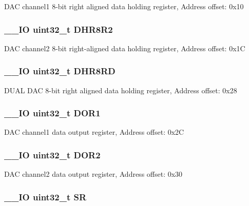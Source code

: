 D\-A\-C channel1 8-\/bit right aligned data holding register, Address offset\-: 0x10 \hypertarget{struct_d_a_c___type_def_a4c435f0e34ace4421241cd5c3ae87fc2}{
\subsubsection[{D\-H\-R8\-R2}]{\setlength{\rightskip}{0pt plus 5cm}\-\_\-\-\_\-\-I\-O uint32\-\_\-t D\-H\-R8\-R2}}\label{struct_d_a_c___type_def_a4c435f0e34ace4421241cd5c3ae87fc2}
D\-A\-C channel2 8-\/bit right-\/aligned data holding register, Address offset\-: 0x1\-C \hypertarget{struct_d_a_c___type_def_a9590269cba8412f1be96b0ddb846ef44}{
\subsubsection[{D\-H\-R8\-R\-D}]{\setlength{\rightskip}{0pt plus 5cm}\-\_\-\-\_\-\-I\-O uint32\-\_\-t D\-H\-R8\-R\-D}}\label{struct_d_a_c___type_def_a9590269cba8412f1be96b0ddb846ef44}
D\-U\-A\-L D\-A\-C 8-\/bit right aligned data holding register, Address offset\-: 0x28 \hypertarget{struct_d_a_c___type_def_aa710505be03a41981c35bacc7ce20746}{
\subsubsection[{D\-O\-R1}]{\setlength{\rightskip}{0pt plus 5cm}\-\_\-\-\_\-\-I\-O uint32\-\_\-t D\-O\-R1}}\label{struct_d_a_c___type_def_aa710505be03a41981c35bacc7ce20746}
D\-A\-C channel1 data output register, Address offset\-: 0x2\-C \hypertarget{struct_d_a_c___type_def_aba9fb810b0cf6cbc1280c5c63be2418b}{
\subsubsection[{D\-O\-R2}]{\setlength{\rightskip}{0pt plus 5cm}\-\_\-\-\_\-\-I\-O uint32\-\_\-t D\-O\-R2}}\label{struct_d_a_c___type_def_aba9fb810b0cf6cbc1280c5c63be2418b}
D\-A\-C channel2 data output register, Address offset\-: 0x30 \hypertarget{struct_d_a_c___type_def_af6aca2bbd40c0fb6df7c3aebe224a360}{
\subsubsection[{S\-R}]{\setlength{\rightskip}{0pt plus 5cm}\-\_\-\-\_\-\-I\-O uint32\-\_\-t S\-R}}\label{struct_d_a_c___type_def_af6aca2bbd40c0fb6df7c3aebe224a360}
